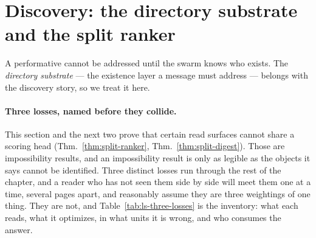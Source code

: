 \documentclass[11pt,a4paper]{article}
\theoremstyle{definition}
\theoremstyle{plain}
\begin{document}
\section{Discovery: the directory substrate and the split ranker}\label{sec:discovery}

A performative cannot be addressed until the swarm knows who exists. The
\emph{directory substrate} --- the existence layer a message must address --- belongs
with the discovery story, so we treat it here.

\paragraph{Three losses, named before they collide.} This section and the next
two prove that certain read surfaces cannot share a scoring head
(Thm.~\ref{thm:split-ranker}, Thm.~\ref{thm:split-digest}). Those are
impossibility results, and an impossibility result is only as legible as the
objects it says cannot be identified. Three distinct losses run through the rest
of the chapter, and a reader who has not seen them side by side will meet them
one at a time, several pages apart, and reasonably assume they are three
weightings of one thing. They are not, and Table~\ref{tab:ls-three-losses} is
the inventory: what each reads, what it optimizes, in what units it is wrong,
and who consumes the answer.
\end{document}
